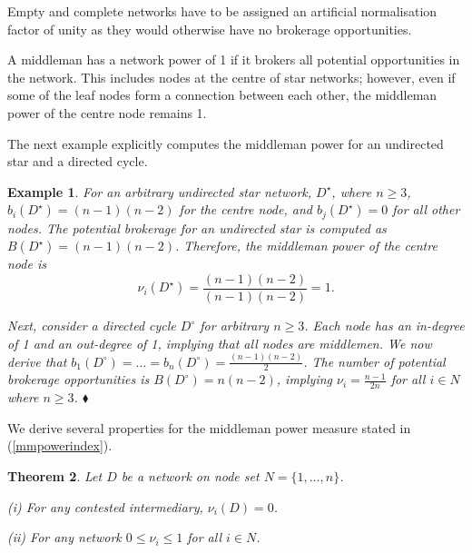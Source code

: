 \documentclass[11pt,fleqn]{article}
\newcounter{llst}
\newenvironment{abet}{\begin{list}{\rm (\alph{llst})}{\usecounter{llst}
\setlength{\itemindent}{0em} \setlength{\leftmargin}{3em}
\setlength{\labelwidth}{2em} \setlength{\labelsep}{1em}}}{\end{list}}
\newtheorem{theorem}{Theorem}[section]
\newtheorem{expl}[theorem]{Example}
\newenvironment{example}{\begin{expl} \rm}{\hfill $\blacklozenge$ \end{expl}}{}
\begin{document}
Empty and complete networks have to be assigned an artificial normalisation factor of unity as they would otherwise have no brokerage opportunities. 

A middleman has a network power of 1 if it brokers all potential opportunities in the network. This includes nodes at the centre of star networks; however, even if some of the leaf nodes form a connection between each other, the middleman power of the centre node remains 1.

The next example explicitly computes the middleman power for an undirected star and a directed cycle.

\begin{example} \label{starcycle}
For an arbitrary undirected star network, $D^{\star}$, where $n \geqslant 3$, $b_{i}(D^{\star}) = (n-1)(n-2)$ for the centre node, and $b_{j}(D^{\star})=0$ for all other nodes. The potential brokerage for an undirected star is computed as $B(D^{\star}) = (n-1)(n-2)$. Therefore, the middleman power of the centre node is
\begin{equation}
\nu_{i}(D^{\star}) = \frac{(n-1)(n-2)}{(n-1)(n-2)} = 1 .
\end{equation}

\noindent Next, consider a directed cycle $D^{\circ}$ for arbitrary $n\geqslant 3$. Each node has an in-degree of 1 and an out-degree of 1, implying that all nodes are middlemen. We now derive that $b_{1}(D^{\circ}) = \ldots = b_{n}(D^{\circ}) = \frac{(n-1)(n-2)}{2}$. The number of potential brokerage opportunities is $B (D^{\circ}) = n(n-2)$, implying $\nu_i = \frac{n-1}{2n}$ for all $i \in N$ where $n \geqslant 3$.
\end{example}

We derive several properties for the middleman power measure stated in (\ref{mmpowerindex}).

\begin{theorem} \label{middlemanpowert}
Let $D$ be a network on node set $N=\{1, \ldots ,n\}$.
\begin{abet}
\item[(i)] For any contested intermediary, $\nu_{i}(D) = 0$.
\item[(ii)] For any network $0 \leqslant \nu_{i} \leqslant 1$ for all $i \in N$.
\end{abet}
\end{theorem}
\end{document}
